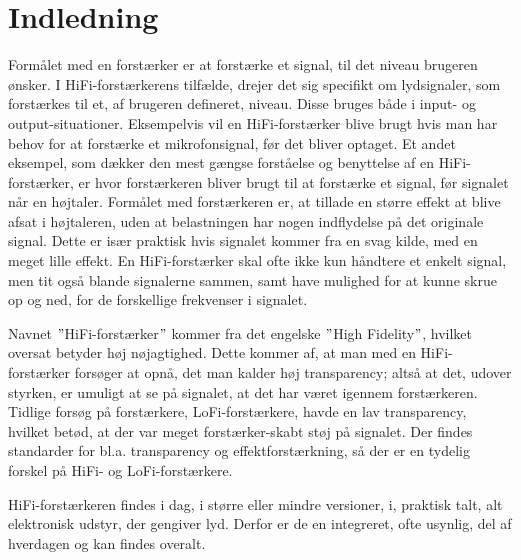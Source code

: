 \chapter{Indledning}
\label{indledning}
Formålet med en forstærker er at forstærke et signal, til det niveau brugeren ønsker. I HiFi-forstærkerens tilfælde, drejer det sig specifikt om lydsignaler, som forstærkes til et, af brugeren defineret, niveau. Disse bruges både i input- og output-situationer. Eksempelvis vil en HiFi-forstærker blive brugt hvis man har behov for at forstærke et mikrofonsignal, før det bliver optaget. Et andet eksempel, som dækker den mest gængse forståelse og benyttelse af en HiFi-forstærker, er hvor forstærkeren bliver brugt til at forstærke et signal, før signalet når en højtaler. Formålet med forstærkeren er, at tillade en større effekt at blive afsat i højtaleren, uden at belastningen har nogen indflydelse på det originale signal. Dette er især praktisk hvis signalet kommer fra en svag kilde, med en meget lille effekt. En HiFi-forstærker skal ofte ikke kun håndtere et enkelt signal, men tit også blande signalerne sammen, samt have mulighed for at kunne skrue op og ned, for de forskellige frekvenser i signalet. 

Navnet $"$HiFi-forstærker$"$ kommer fra det engelske $"$High Fidelity$"$, hvilket oversat betyder høj nøjagtighed. Dette kommer af, at man med en HiFi-forstærker forsøger at opnå, det man kalder høj transparency; altså at det, udover styrken, er umuligt at se på signalet, at det har været igennem forstærkeren. Tidlige forsøg på forstærkere, LoFi-forstærkere, havde en lav transparency, hvilket betød, at der var meget forstærker-skabt støj på signalet. Der findes standarder for bl.a. transparency og effektforstærkning, så der er en tydelig forskel på HiFi- og LoFi-forstærkere.

HiFi-forstærkeren findes i dag, i større eller mindre versioner, i, praktisk talt, alt elektronisk udstyr, der gengiver lyd. Derfor er de en integreret, ofte usynlig, del af hverdagen og kan findes overalt.